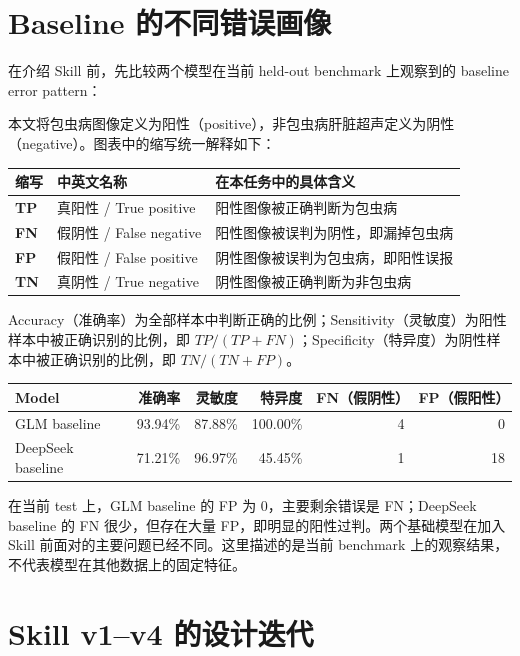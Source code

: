 \documentclass[11pt,a4paper]{ctexart}
\begin{document}
\section{Baseline 的不同错误画像}

在介绍 Skill 前，先比较两个模型在当前 held-out benchmark 上观察到的 baseline error pattern：

本文将包虫病图像定义为阳性（positive），非包虫病肝脏超声定义为阴性（negative）。图表中的缩写统一解释如下：

\begin{center}
\small
\begin{tabularx}{0.94\textwidth}{@{}>{\bfseries}p{1.4cm}p{5.6cm}X@{}}
\toprule
缩写 & 中英文名称 & 在本任务中的具体含义 \\
\midrule
TP & 真阳性 / True positive & 阳性图像被正确判断为包虫病 \\
FN & 假阴性 / False negative & 阳性图像被误判为阴性，即漏掉包虫病 \\
FP & 假阳性 / False positive & 阴性图像被误判为包虫病，即阳性误报 \\
TN & 真阴性 / True negative & 阴性图像被正确判断为非包虫病 \\
\bottomrule
\end{tabularx}
\end{center}

Accuracy（准确率）为全部样本中判断正确的比例；Sensitivity（灵敏度）为阳性样本中被正确识别的比例，即 $TP/(TP+FN)$；Specificity（特异度）为阴性样本中被正确识别的比例，即 $TN/(TN+FP)$。

\begin{center}
\small
\begin{tabular}{lrrrrr}
\toprule
Model & 准确率 & 灵敏度 & 特异度 & FN（假阴性） & FP（假阳性） \\
\midrule
GLM baseline & 93.94\% & 87.88\% & 100.00\% & 4 & 0 \\
DeepSeek baseline & 71.21\% & 96.97\% & 45.45\% & 1 & 18 \\
\bottomrule
\end{tabular}
\end{center}

在当前 test 上，GLM baseline 的 FP 为 0，主要剩余错误是 FN；DeepSeek baseline 的 FN 很少，但存在大量 FP，即明显的阳性过判。两个基础模型在加入 Skill 前面对的主要问题已经不同。这里描述的是当前 benchmark 上的观察结果，不代表模型在其他数据上的固定特征。

\section{Skill v1--v4 的设计迭代}
\end{document}
